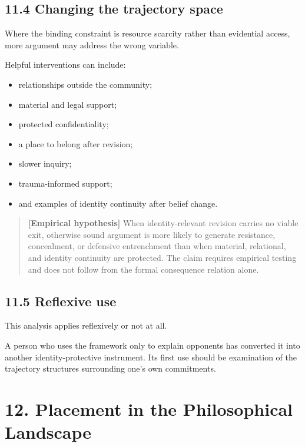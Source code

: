 \documentclass[
  11pt,
]{article}
\providecommand{\tightlist}{%
  \setlength{\itemsep}{0pt}\setlength{\parskip}{0pt}}
\begin{document}
\subsection{11.4 Changing the trajectory
space}\label{changing-the-trajectory-space}

Where the binding constraint is resource scarcity rather than evidential
access, more argument may address the wrong variable.

Helpful interventions can include:

\begin{itemize}
\tightlist
\item
  relationships outside the community;
\item
  material and legal support;
\item
  protected confidentiality;
\item
  a place to belong after revision;
\item
  slower inquiry;
\item
  trauma-informed support;
\item
  and examples of identity continuity after belief change.
\end{itemize}

\begin{quote}
\textbf{{[}Empirical hypothesis{]}} When identity-relevant revision
carries no viable exit, otherwise sound argument is more likely to
generate resistance, concealment, or defensive entrenchment than when
material, relational, and identity continuity are protected. The claim
requires empirical testing and does not follow from the formal
consequence relation alone.
\end{quote}

\subsection{11.5 Reflexive use}\label{reflexive-use}

This analysis applies reflexively or not at all.

A person who uses the framework only to explain opponents has converted
it into another identity-protective instrument. Its first use should be
examination of the trajectory structures surrounding one's own
commitments.

\section{12. Placement in the Philosophical
Landscape}\label{placement-in-the-philosophical-landscape}
\end{document}
